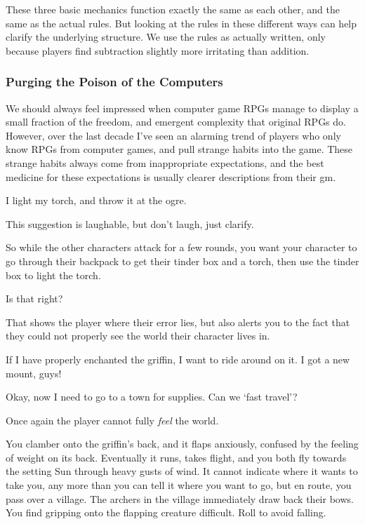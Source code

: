 \begin{multicols}{2}
\begin{itemize}
\end{itemize}

These three basic mechanics function exactly the same as each other, and the same as the actual rules.
But looking at the rules in these different ways can help clarify the underlying structure.
We use the rules as actually written, only because players find subtraction slightly more irritating than addition.

\subsubsection{Purging the Poison of the Computers}

We should always feel impressed when computer game RPGs manage to display a small fraction of the freedom, and emergent complexity that original RPGs do.
However, over the last decade I've seen an alarming trend of players who only know RPGs from computer games, and pull strange habits into the game.
These strange habits always come from inappropriate expectations, and the best medicine for these expectations is usually clearer descriptions from their \gls{gm}.

\begin{boxtext}
  I light my torch, and throw it at the ogre.
\end{boxtext}

This suggestion is laughable, but don't laugh, just clarify.

\begin{speechtext}
  So while the other characters attack for a few rounds, you want your character to go through their backpack to get their tinder box and a torch, then use the tinder box to light the torch.

  Is that right?
\end{speechtext}

That shows the player where their error lies, but also alerts you to the fact that they could not properly see the world their character lives in.

\begin{boxtext}
  If I have properly enchanted the griffin, I want to ride around on it.
  I got a new mount, guys!

  Okay, now I need to go to a town for supplies.
  Can we `fast travel'?
\end{boxtext}

Once again the player cannot fully \emph{feel} the world.

\begin{speechtext}
  You clamber onto the griffin's back, and it flaps anxiously, confused by the feeling of weight on its back.
  Eventually it runs, takes flight, and you both fly towards the setting Sun through heavy gusts of wind.
  It cannot indicate where it wants to take you, any more than you can tell it where you want to go, but en route, you pass over a \gls{village}.
  The archers in the \gls{village} immediately draw back their bows.
  You find gripping onto the flapping creature difficult.
  Roll  to avoid falling.
  

\end{speechtext}
\end{multicols}
